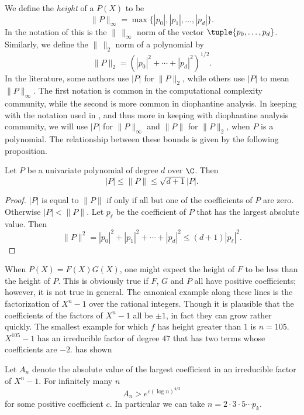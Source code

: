 We define the {\em height} of a $P(X)$ to be 
\[
\|P \|_{\infty} = 
  \max \{\left|p_{0}\right|, \left|p_{1}\right|, \ldots, \left|p_{d}\right|\}.
\]
In the notation of  this is the $\|\,\|_{\infty}$ norm
of the vector $\tuple{p_{0},\ldots, p_{d}}$.  Similarly, we define the
$\|\,\|_{2}$ norm of a polynomial by
\[
\|P \|_{2} = \left(\left|p_{0}\right|^{2} + \cdots +
    \left|p_{d}\right|^{2}\right)^{1/2}.
\]
In the literature, some authors use $|P|$ for $\|P\|_{2}$, while others use
$|P|$ to mean $\|P\|_{\infty}$.  The first notation is common in the
computational complexity community, while the second is more common in
diophantine analysis.  In keeping with the notation used in
, and thus more in keeping with diophantine analysis
community, we will use $|P|$ for $\|P\|_{\infty}$ and $\|P\|$ for
$\|P\|_{2}$, when $P$ is a polynomial.  The relationship between these
bounds is given by the following proposition.

\begin{proposition}\label{PB:HeightRel:Prop}
Let $P$ be a univariate polynomial of degree $d$ over $\C$.  Then
\[
|P| \le \|P\| \le \sqrt{d+1} |P|.
\]
\end{proposition}

\begin{proof}
$|P|$ is equal to $\|P\|$ if only if all but one of the coefficients
of $P$ are zero.  Otherwise $|P| < \|P\|$.  Let $p_{\ell}$ be the
coefficient of $P$ that has the largest absolute value. Then
\[
\|P\|^2 = |p_0|^2 + |p_1|^2 + \cdots + |p_d|^2 \le (d+1) |p_{\ell}|^2.
\]
\end{proof}

When $P(X) = F(X) G(X)$, one might expect the height of $F$ to be less
than the height of $P$.  This is obviously true if $F$, $G$ and $P$
all have positive coefficients; however, it is not true in general.
The canonical example along these lines is the factorization of
$X^{n}-1$ over the rational integers.  Though it is plausible that the
coefficients of the factors of $X^{n}-1$ all be $\pm1$, in fact they
can grow rather quickly. The smallest example for which $f$ has height
greater than $1$ is $n=105$.  $X^{105}-1$ has an irreducible factor of
degree $47$ that has two terms whose coefficients are $-2$.  {\Erdos}
has shown \cite{Erdos46}
\begin{proposition} [\Erdos]
Let $A_n$ denote the absolute value of the largest coefficient in an
irreducible factor of $X^n -1$.  For infinitely many $n$
\[
A_n > e^{c (\log n)^{4/3}}
\]
for some positive coefficient $c$.  In particular we can take $n = 2
\cdot 3 \cdot 5 \cdots p_k$.
\end{proposition}

